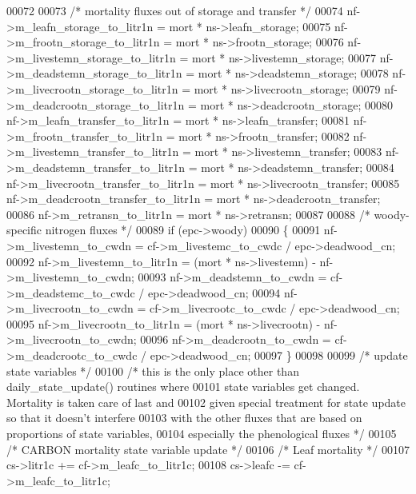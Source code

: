 \begin{DoxyCode}
00072     
00073     \textcolor{comment}{/* mortality fluxes out of storage and transfer */}
00074     nf->m\_leafn\_storage\_to\_litr1n  = mort * ns->leafn\_storage;
00075     nf->m\_frootn\_storage\_to\_litr1n  = mort * ns->frootn\_storage;
00076     nf->m\_livestemn\_storage\_to\_litr1n  = mort * ns->livestemn\_storage;
00077     nf->m\_deadstemn\_storage\_to\_litr1n  = mort * ns->deadstemn\_storage;
00078     nf->m\_livecrootn\_storage\_to\_litr1n  = mort * ns->livecrootn\_storage;
00079     nf->m\_deadcrootn\_storage\_to\_litr1n  = mort * ns->deadcrootn\_storage;
00080     nf->m\_leafn\_transfer\_to\_litr1n = mort * ns->leafn\_transfer;
00081     nf->m\_frootn\_transfer\_to\_litr1n = mort * ns->frootn\_transfer;
00082     nf->m\_livestemn\_transfer\_to\_litr1n = mort * ns->livestemn\_transfer;
00083     nf->m\_deadstemn\_transfer\_to\_litr1n = mort * ns->deadstemn\_transfer;
00084     nf->m\_livecrootn\_transfer\_to\_litr1n = mort * ns->livecrootn\_transfer;
00085     nf->m\_deadcrootn\_transfer\_to\_litr1n = mort * ns->deadcrootn\_transfer;
00086     nf->m\_retransn\_to\_litr1n = mort * ns->retransn;
00087     
00088     \textcolor{comment}{/* woody-specific nitrogen fluxes */}
00089     \textcolor{keywordflow}{if} (epc->woody)
00090     \{
00091         nf->m\_livestemn\_to\_cwdn = cf->m\_livestemc\_to\_cwdc / epc->deadwood\_cn;   
00092         nf->m\_livestemn\_to\_litr1n = (mort * ns->livestemn) - nf->m\_livestemn\_to\_cwdn;
00093         nf->m\_deadstemn\_to\_cwdn = cf->m\_deadstemc\_to\_cwdc / epc->deadwood\_cn;   
00094         nf->m\_livecrootn\_to\_cwdn = cf->m\_livecrootc\_to\_cwdc / epc->deadwood\_cn;  
00095         nf->m\_livecrootn\_to\_litr1n = (mort * ns->livecrootn) - nf->m\_livecrootn\_to\_cwdn;
00096         nf->m\_deadcrootn\_to\_cwdn = cf->m\_deadcrootc\_to\_cwdc / epc->deadwood\_cn;  
00097     \}
00098     
00099     \textcolor{comment}{/* update state variables */}
00100     \textcolor{comment}{/* this is the only place other than daily\_state\_update() routines where}
00101 \textcolor{comment}{    state variables get changed.  Mortality is taken care of last and }
00102 \textcolor{comment}{    given special treatment for state update so that it doesn't interfere}
00103 \textcolor{comment}{    with the other fluxes that are based on proportions of state variables,}
00104 \textcolor{comment}{    especially the phenological fluxes */}
00105     \textcolor{comment}{/* CARBON mortality state variable update */}    
00106     \textcolor{comment}{/*   Leaf mortality */}
00107     cs->litr1c         += cf->m\_leafc\_to\_litr1c;
00108     cs->leafc          -= cf->m\_leafc\_to\_litr1c;

\end{DoxyCode}
